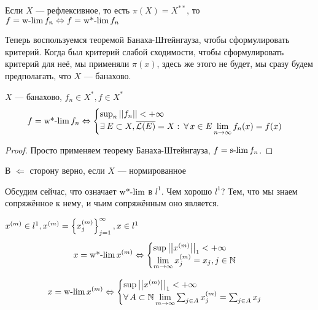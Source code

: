 \documentclass[document]{subfiles}
\begin{document}
\begin{remark}
    Если $X$ --- рефлексивное, то есть $\pi(X) = X^{**}$, то $f = \operatorname{w-lim} f_n \Leftrightarrow f = \operatorname{w*-lim} f_n$
\end{remark}

Теперь воспользуемся теоремой Банаха-Штейнгауза, чтобы сформулировать критерий. Когда был критерий слабой сходимости, чтобы сформулировать критерий для неё, 
мы применяли $\pi(x)$, здесь же этого не будет, мы сразу будем предполагать, что $X$ --- банахово.
\begin{theorem}
    $X$ --- банахово, $f_n \in X^*, f \in X^*$
    \[ f = \wstarlim f_n \Leftrightarrow \begin{cases}
        \sup_n \norm{f_n} < +\infty \\
        \exists E \subset X, \overline{\calL(E)} = X : \: \forall x \in E \liml_{n \to \infty} f_n(x) = f(x)
    \end{cases}
    \] 
\end{theorem}

\begin{proof}
    Просто применяем теорему Банаха-Штейнгауза, $f = \operatorname{s-lim} f_n$.
\end{proof}

\begin{remark}
    \label{chap10:wstarlim-remark}
    В $\Leftarrow$ сторону верно, если $X$ --- нормированное
\end{remark}

Обсудим сейчас, что означает $\operatorname{w*-lim}$ в $l^1$. Чем хорошо $l^1$? Тем, что мы знаем сопряжённое к нему, и чьим сопряжённым оно является.

\begin{theoremwobox}
    $x^{(m)} \in l^1, x^{(m)} = \left\{x^{(m)}_j\right\}^\infty_{j=1}, x \in l^1$
    \[ x = \operatorname{w*-lim} x^{(m)} \Leftrightarrow \begin{cases}
        \sup \left|\left| {x^{(m)}} \right| \right|_1 < +\infty \\
        \lim\limits_{m \to \infty} x^{(m)}_j = x_j, j \in \mathbb{N}
    \end{cases} \]

    \[ x = \wlim x^{(m)} \Leftrightarrow \begin{cases}
        \sup \norm{x^{(m)}}_1 < +\infty \\
        \forall A \subset \bN \liml_{m \to \infty} \sum_{j \in A} x^{(m)}_j = \sum_{j \in A} x_j
    \end{cases} \]
\end{theoremwobox}
\end{document}
